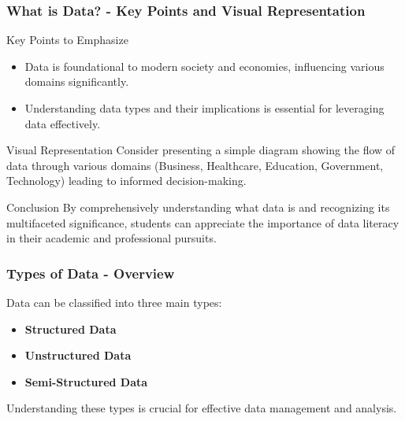 \documentclass{beamer}
\begin{document}
\begin{frame}[fragile]
    \frametitle{What is Data? - Key Points and Visual Representation}
    \begin{block}{Key Points to Emphasize}
        \begin{itemize}
            \item Data is foundational to modern society and economies, influencing various domains significantly.
            \item Understanding data types and their implications is essential for leveraging data effectively.
        \end{itemize}
    \end{block}
    
    \begin{block}{Visual Representation}
        Consider presenting a simple diagram showing the flow of data through various domains (Business, Healthcare, Education, Government, Technology) leading to informed decision-making.
    \end{block}

    \begin{block}{Conclusion}
        By comprehensively understanding what data is and recognizing its multifaceted significance, students can appreciate the importance of data literacy in their academic and professional pursuits.
    \end{block}
\end{frame}

\begin{frame}[fragile]
    \frametitle{Types of Data - Overview}
    Data can be classified into three main types: 
    \begin{itemize}
        \item \textbf{Structured Data}
        \item \textbf{Unstructured Data}
        \item \textbf{Semi-Structured Data}
    \end{itemize}
    Understanding these types is crucial for effective data management and analysis.
\end{frame}
\end{document}
